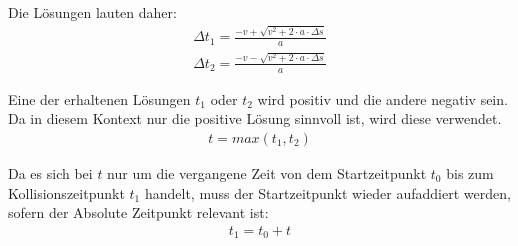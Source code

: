 Die Lösungen lauten daher:
\begin{align}
    \Delta t_1 = \frac{-v + \sqrt{v^2 + 2 \cdot a \cdot \Delta s}}{a}\\
    \Delta t_2 = \frac{-v - \sqrt{v^2 + 2 \cdot a \cdot \Delta s}}{a}
\end{align}

Eine der erhaltenen Lösungen $t_1$ oder $t_2$ wird positiv und die andere negativ sein.
Da in diesem Kontext nur die positive Lösung sinnvoll ist, wird diese verwendet.
\begin{align}
    t = max(t_1, t_2)
\end{align}

Da es sich bei $t$ nur um die vergangene Zeit von dem Startzeitpunkt $t_0$ bis zum Kollisionszeitpunkt $t_1$ handelt,
muss der Startzeitpunkt wieder aufaddiert werden, sofern der Absolute Zeitpunkt relevant ist:
\begin{align}
    t_1 = t_0 + t
\end{align}

